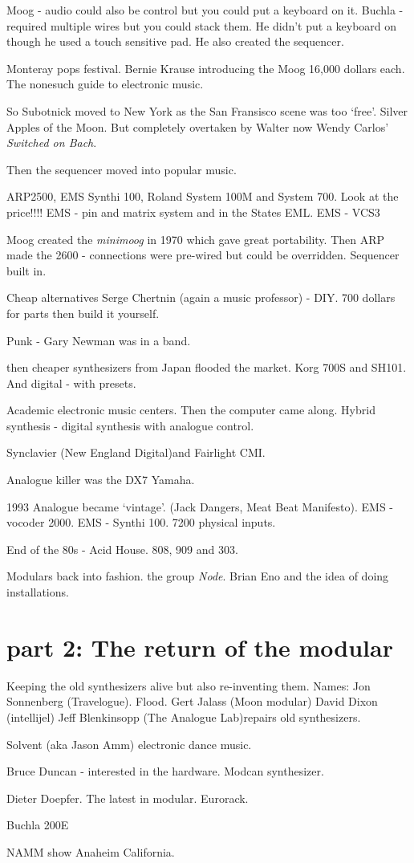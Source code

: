 Moog - audio could also be control but you could put a keyboard on it.
Buchla - required multiple wires but you could stack them. He didn't put a keyboard on though he used a touch sensitive pad. He also created the sequencer. 

Monteray pops festival. Bernie Krause introducing the Moog 16,000 dollars each.
The nonesuch guide to electronic music.  

So Subotnick moved to New York as the San Fransisco scene was too `free'. Silver Apples of the Moon. But completely overtaken by Walter now Wendy Carlos' \textit{Switched on Bach}. 

Then the sequencer moved into popular music.

ARP2500, EMS Synthi 100, Roland System 100M and System 700. Look at the price!!!! 
EMS - pin and matrix system and in the States EML. 
EMS - VCS3

Moog created the \textit{minimoog} in 1970 which gave great portability. Then ARP made the 2600 - connections were pre-wired but could be overridden. Sequencer built in. 

Cheap alternatives Serge Chertnin (again a music professor) - DIY. 700 dollars for parts then build it yourself.   

Punk - Gary Newman was in a band. 

then cheaper synthesizers from Japan flooded the market. Korg 700S and SH101. 
And digital - with presets. 

Academic electronic music centers. Then the computer came along. Hybrid synthesis - digital synthesis with analogue control. 

Synclavier (New England Digital)and Fairlight CMI. 

Analogue killer was the DX7 Yamaha. 

1993 Analogue became `vintage'. (Jack Dangers, Meat Beat Manifesto). EMS - vocoder 2000.   
EMS - Synthi 100. 7200 physical inputs. 

End of the 80s - Acid House. 808, 909 and 303. 

Modulars back into fashion. the group \textit{Node}. Brian Eno and the idea of doing installations. 

\section{part 2: The return of the modular}
Keeping the old synthesizers alive but also re-inventing them. 
Names: Jon Sonnenberg (Travelogue). Flood. Gert Jalass (Moon modular) David Dixon (intellijel) Jeff Blenkinsopp (The Analogue Lab)repairs old synthesizers. 

Solvent (aka Jason Amm) electronic dance music.  

Bruce Duncan - interested in the hardware. Modcan synthesizer.

Dieter Doepfer. The latest in modular. Eurorack.

Buchla 200E

NAMM show Anaheim California.


